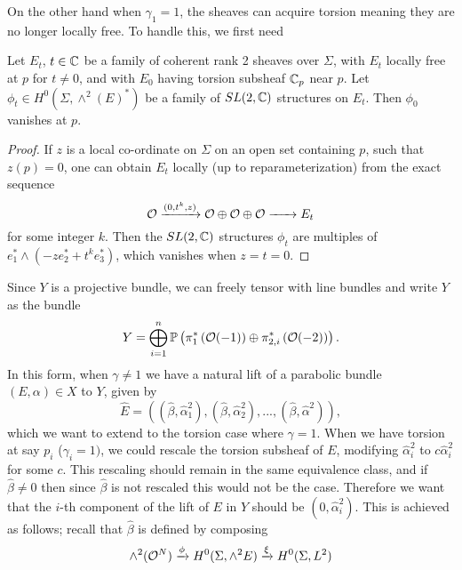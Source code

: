 	On the other hand when $\gamma_1 = 1$, the sheaves can acquire torsion meaning they are no longer locally free. To handle this, we first need
	\begin{lemma}[H\& J Lemma 4.11]
		Let $E_t$, $t\in\mathbb{C}$ be a family of coherent rank 2 sheaves over $\Sigma$, with $E_t$ locally free at $p$ for $t\neq 0$, and with $E_0$ having torsion subsheaf $\mathbb{C}_p$ near $p$. Let $\phi_t \in H^0(\Sigma, \wedge^2(E)^\ast)$ be a family of $SL(2,\mathbb{C})$ structures on $E_t$. Then $\phi_0$ vanishes at $p$.
		\label{t:sl2-lemma}
	\end{lemma}
	\begin{proof}
		If $z$ is a local co-ordinate on $\Sigma$ on an open set containing $p$, such that $z(p)=0$, one can obtain $E_t$ locally (up to reparameterization) from the exact sequence 
		\begin{equation}
			\mathcal{O} \xrightarrow{(0,t^k,z)} \mathcal{O} \oplus \mathcal{O} \oplus \mathcal{O} \xrightarrow{~~~~~}E_t
		\end{equation}
		for some integer $k$. Then the $SL(2,\mathbb{C})$ structures $\phi_t$ are multiples of $e_1^\ast \wedge (-ze^\ast_2 + t^k e^\ast_3)$, which vanishes when $z=t=0$.
	\end{proof}
	Since $Y$ is a projective bundle, we can freely tensor with line bundles and write $Y$ as the bundle
	\begin{equation}
		Y = \bigoplus_{i=1}^n\mathbb{P}\left(\pi_1^\ast\left(
		\mathcal{O}(-1)
		\right)\oplus \pi_{2,i}^\ast\left(\mathcal{O}(-2)\right)\right).
	\end{equation}
	In this form, when $\gamma \neq 1$ we have a natural lift of a parabolic bundle $(E,\alpha)\in X$ to $Y$, given by 
	\begin{equation}
		\hat{E} = \left(
		(\hat{\beta}, \hat{\alpha}_1^2),(\hat{\beta},\hat{\alpha}_2^2),...,(\hat{\beta},\hat{\alpha}^2)
		\right),
	\end{equation}
	which we want to extend to the torsion case where $\gamma = 1$. When we have torsion at say $p_i$ ($\gamma_i = 1)$, we could rescale the torsion subsheaf of $E$, modifying $\hat{\alpha}_i^2$ to $c\hat{\alpha}_i^2$ for some $c$. This rescaling should remain in the same equivalence class, and if $\hat{\beta} \neq 0$ then since $\hat{\beta}$ is not rescaled this would not be the case. Therefore we want that the $i$-th component of the lift of $E$ in $Y$ should be $(0,\hat{\alpha}_i^2)$. This is achieved as follows; recall that $\hat{\beta}$ is defined by composing
	\begin{equation}
		\wedge^2(\mathcal{O}^N) \xrightarrow{\phi} H^0(\Sigma, \wedge^2 E) \xrightarrow{\xi} H^0(\Sigma, L^2)
	\end{equation}
